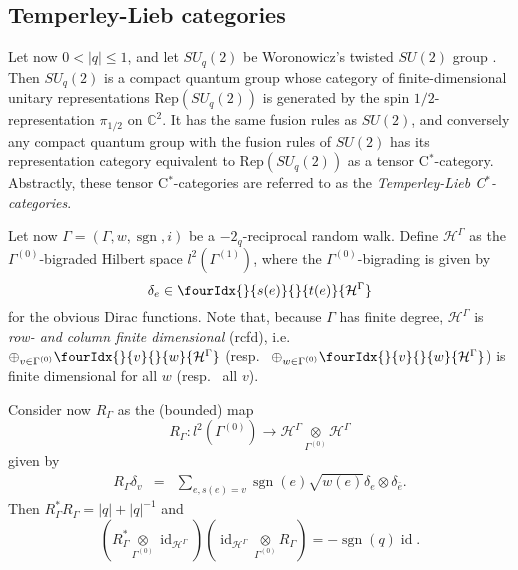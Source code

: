 \documentclass[10pt]{article}
\DeclareMathOperator{\id}{id}
\DeclareMathOperator{\sgn}{\mathrm{sgn}}
\newcommand{\C}{\mathbb{C}}
\newcommand{\Hsp}{\mathcal{H}}
\newcommand{\Rep}{\mathrm{Rep}}
\newcommand{\Gr}[5]{\fourIdx{#2}{#4}{#3}{#5}{#1}}%
\newcommand{\Gru}[3]{\Gr{#1}{}{}{#2}{#3}}
\theoremstyle{definition}
\numberwithin{equation}{section}
\begin{document}
\subsection{Temperley-Lieb categories}

Let now $0<|q|\leq 1$, and let $SU_q(2)$ be Woronowicz's twisted $SU(2)$ group \cite{Wor1}. Then $SU_q(2)$ is a compact quantum group whose category of finite-dimensional unitary representations $\Rep(SU_q(2))$ is generated by the spin $1/2$-representation $\pi_{1/2}$ on $\C^2$. It has the same fusion rules as $SU(2)$, and conversely any compact quantum group with the fusion rules of $SU(2)$ has its representation category equivalent to $\Rep(SU_q(2))$ as a tensor C$^*$-category. Abstractly, these tensor C$^*$-categories are referred to as the \emph{Temperley-Lieb C$^*$-categories}.

Let now $\Gamma = (\Gamma,w,\sgn,i)$ be a $-2_q$-reciprocal random walk. Define $\Hsp^{\Gamma}$ as the $\Gamma^{(0)}$-bigraded Hilbert space $l^2(\Gamma^{(1)})$, where the $\Gamma^{(0)}$-bigrading is given by \[\delta_e \in \Gru{\Hsp^{\Gamma}}{s(e)}{t(e)}\] for the obvious Dirac functions. Note that, because $\Gamma$ has finite degree, $\Hsp^{\Gamma}$ is \emph{row- and column finite dimensional} (rcfd), i.e.~ $\oplus_{v\in \Gamma^{(0)}} \Gru{\Hsp^{\Gamma}}{v}{w}$ (resp.~ $\oplus_{w\in \Gamma^{(0)}} \Gru{\Hsp^{\Gamma}}{v}{w}$) is finite dimensional for all $w$ (resp.~ all $v$). 

Consider now $R_{\Gamma}$ as the (bounded) map \[R_{\Gamma}:l^2(\Gamma^{(0)})\rightarrow \Hsp^{\Gamma}\underset{\Gamma^{(0)}}{\otimes} \Hsp^{\Gamma}\] given by \begin{eqnarray*} R_{\Gamma} \delta_v &=& \sum_{e,s(e) = v} \sgn(e)\sqrt{w(e)}\delta_e \otimes \delta_{\bar{e}}.\end{eqnarray*} Then $R_{\Gamma}^*R_{\Gamma} = |q|+|q|^{-1}$ and \[(R_{\Gamma}^*\underset{\Gamma^{(0)}}{\otimes} \id_{\Hsp^{\Gamma}})(\id_{\Hsp^{\Gamma}}\underset{\Gamma^{(0)}}{\otimes} R_{\Gamma}) = -\sgn(q)\id.\]



\end{document}
